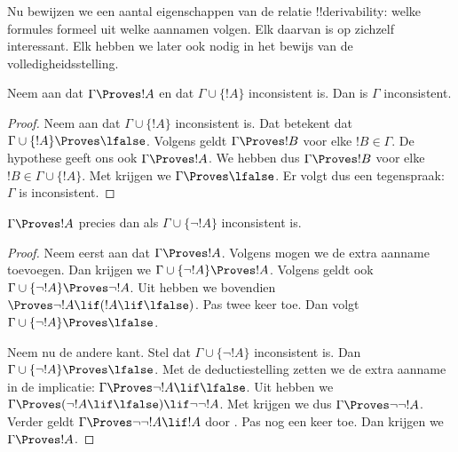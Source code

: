 \documentclass[../../../include/open-logic-section]{subfiles}
\begin{document}
      {}
      {}


Nu bewijzen we een aantal eigenschappen van de relatie
!!{derivability}: welke formules formeel uit welke aannamen volgen.
Elk daarvan is op zichzelf interessant. Elk hebben we later ook nodig
in het bewijs van de volledigheidsstelling.

\begin{prop}
  Neem aan dat $\Gamma \Proves !A$ en dat $\Gamma \cup \{!A\}$
  inconsistent is. Dan is $\Gamma$ inconsistent.
\end{prop}

\begin{proof}
  Neem aan dat $\Gamma \cup \{!A\}$ inconsistent is. Dat betekent dat
  $\Gamma \cup \{!A\} \Proves \lfalse$. Volgens
   geldt $\Gamma \Proves !B$ voor elke
  $!B \in \Gamma$. De hypothese geeft ons ook $\Gamma \Proves !A$.
  We hebben dus $\Gamma \Proves !B$ voor elke $!B \in \Gamma \cup
  \{!A\}$. Met
   krijgen we $\Gamma \Proves \lfalse$.
  Er volgt dus een tegenspraak: $\Gamma$ is inconsistent.
\end{proof}

\begin{prop}
$\Gamma \Proves !A$ precies dan als $\Gamma \cup \{\lnot !A\}$
inconsistent is.
\end{prop}

\begin{proof}
Neem eerst aan dat $\Gamma \Proves !A$. Volgens
 mogen we de extra aanname toevoegen. Dan
krijgen we $\Gamma \cup \{\lnot !A\} \Proves !A$. Volgens
 geldt ook $\Gamma \cup \{\lnot !A\}
\Proves \lnot !A$. Uit  hebben we bovendien
$\Proves \lnot !A \lif (!A \lif \lfalse)$. Pas
 twee keer toe. Dan volgt $\Gamma \cup \{\lnot
!A\} \Proves \lfalse$.

Neem nu de andere kant. Stel dat $\Gamma \cup \{\lnot !A\}$
inconsistent is. Dan $\Gamma \cup \{\lnot !A\} \Proves \lfalse$.
Met de deductiestelling zetten we de extra aanname in de implicatie:
$\Gamma \Proves \lnot !A \lif \lfalse$. Uit
 hebben we $\Gamma \Proves (\lnot !A \lif
\lfalse) \lif \lnot\lnot !A$. Met  krijgen we dus
$\Gamma \Proves \lnot\lnot !A$. Verder geldt $\Gamma \Proves
\lnot\lnot !A \lif !A$ door . Pas
 nog een keer toe. Dan krijgen we $\Gamma \Proves
!A$.
\end{proof}
\end{document}
